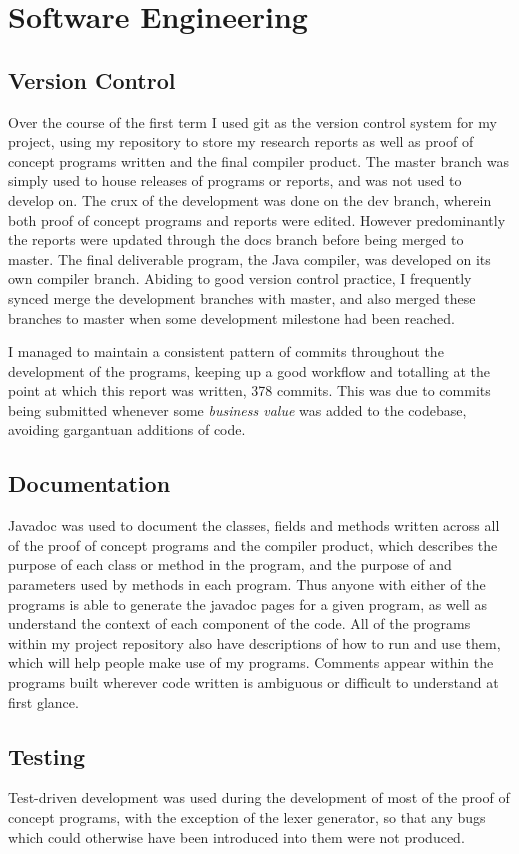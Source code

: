 \documentclass[a4paper, 11pt]{article}
\begin{document}
\newpage\section{Software Engineering}
\subsection{Version Control}
Over the course of the first term I used git as the version control system for my project, using my repository to store my research reports as well as proof of concept programs written and the final compiler product. The master branch was simply used to house releases of programs or reports, and was not used to develop on. The crux of the development was done on the dev branch, wherein both proof of concept programs and reports were edited. However predominantly the reports were updated through the docs branch before being merged to master. The final deliverable program, the Java compiler, was developed on its own compiler branch. Abiding to good version control practice, I frequently synced merge the development branches with master, and also merged these branches to master when some development milestone had been reached. 

I managed to maintain a consistent pattern of commits throughout the development of the programs, keeping up a good workflow and totalling at the point at which this report was written, 378 commits. This was due to commits being submitted whenever some \textit{business value} was added to the codebase, avoiding gargantuan additions of code.

\subsection{Documentation}
Javadoc was used to document the classes, fields and methods written across all of the proof of concept programs and the compiler product, which describes the purpose of each class or method in the program, and the purpose of and parameters used by methods in each program. Thus anyone with either of the programs is able to generate the javadoc pages for a given program, as well as understand the context of each component of the code. All of the programs within my project repository also have descriptions of how to run and use them, which will help people make use of my programs. Comments appear within the programs built wherever code written is ambiguous or difficult to understand at first glance.

\subsection{Testing}
Test-driven development was used during the development of most of the proof of concept programs, with the exception of the lexer generator, so that any bugs which could otherwise have been introduced into them were not produced.
\end{document}
